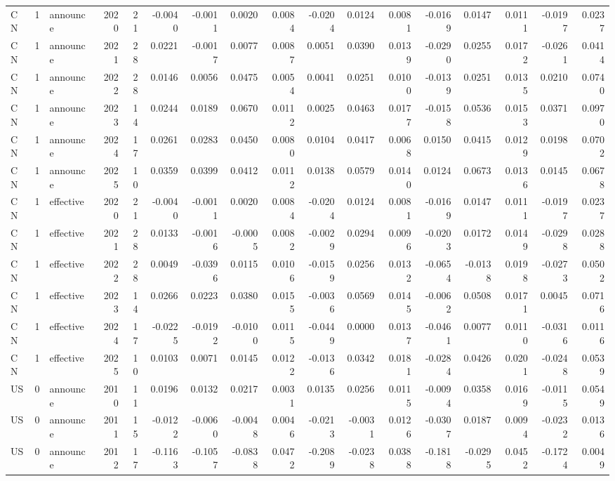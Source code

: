 \begin{tabular}{lrlrrrrrrrrrrrrrr}
CN & 1 & announce & 2020 & 21 & -0.0040 & -0.0011 & 0.0020 & 0.0084 & -0.0204 & 0.0124 & 0.0081 & -0.0169 & 0.0147 & 0.0111 & -0.0197 & 0.0237 \\
CN & 1 & announce & 2021 & 28 & 0.0221 & -0.0017 & 0.0077 & 0.0087 & 0.0051 & 0.0390 & 0.0139 & -0.0290 & 0.0255 & 0.0172 & -0.0261 & 0.0414 \\
CN & 1 & announce & 2022 & 28 & 0.0146 & 0.0056 & 0.0475 & 0.0054 & 0.0041 & 0.0251 & 0.0100 & -0.0139 & 0.0251 & 0.0135 & 0.0210 & 0.0740 \\
CN & 1 & announce & 2023 & 14 & 0.0244 & 0.0189 & 0.0670 & 0.0112 & 0.0025 & 0.0463 & 0.0177 & -0.0158 & 0.0536 & 0.0153 & 0.0371 & 0.0970 \\
CN & 1 & announce & 2024 & 17 & 0.0261 & 0.0283 & 0.0450 & 0.0080 & 0.0104 & 0.0417 & 0.0068 & 0.0150 & 0.0415 & 0.0129 & 0.0198 & 0.0702 \\
CN & 1 & announce & 2025 & 10 & 0.0359 & 0.0399 & 0.0412 & 0.0112 & 0.0138 & 0.0579 & 0.0140 & 0.0124 & 0.0673 & 0.0136 & 0.0145 & 0.0678 \\
CN & 1 & effective & 2020 & 21 & -0.0040 & -0.0011 & 0.0020 & 0.0084 & -0.0204 & 0.0124 & 0.0081 & -0.0169 & 0.0147 & 0.0111 & -0.0197 & 0.0237 \\
CN & 1 & effective & 2021 & 28 & 0.0133 & -0.0016 & -0.0005 & 0.0082 & -0.0029 & 0.0294 & 0.0096 & -0.0203 & 0.0172 & 0.0149 & -0.0298 & 0.0288 \\
CN & 1 & effective & 2022 & 28 & 0.0049 & -0.0396 & 0.0115 & 0.0106 & -0.0159 & 0.0256 & 0.0132 & -0.0654 & -0.0138 & 0.0198 & -0.0273 & 0.0502 \\
CN & 1 & effective & 2023 & 14 & 0.0266 & 0.0223 & 0.0380 & 0.0155 & -0.0036 & 0.0569 & 0.0145 & -0.0062 & 0.0508 & 0.0171 & 0.0045 & 0.0716 \\
CN & 1 & effective & 2024 & 17 & -0.0225 & -0.0192 & -0.0100 & 0.0115 & -0.0449 & 0.0000 & 0.0137 & -0.0461 & 0.0077 & 0.0110 & -0.0316 & 0.0116 \\
CN & 1 & effective & 2025 & 10 & 0.0103 & 0.0071 & 0.0145 & 0.0122 & -0.0136 & 0.0342 & 0.0181 & -0.0284 & 0.0426 & 0.0201 & -0.0248 & 0.0539 \\
US & 0 & announce & 2010 & 11 & 0.0196 & 0.0132 & 0.0217 & 0.0031 & 0.0135 & 0.0256 & 0.0115 & -0.0094 & 0.0358 & 0.0169 & -0.0115 & 0.0549 \\
US & 0 & announce & 2011 & 15 & -0.0122 & -0.0060 & -0.0048 & 0.0046 & -0.0213 & -0.0031 & 0.0126 & -0.0307 & 0.0187 & 0.0094 & -0.0232 & 0.0136 \\
US & 0 & announce & 2012 & 17 & -0.1163 & -0.1057 & -0.0838 & 0.0472 & -0.2089 & -0.0238 & 0.0388 & -0.1818 & -0.0295 & 0.0452 & -0.1724 & 0.0049 \\

\end{tabular}
